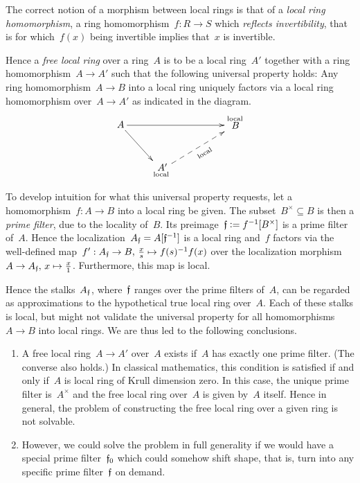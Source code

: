 \documentclass{ws-rv9x6}
\begin{document}
{The correct notion of a morphism between local rings is that of a \emph{local
ring homomorphism}, a ring homomorphism~$f : R \to S$ which \emph{reflects
invertibility}, that is for which~$f(x)$ being invertible implies that~$x$ is
invertible.

Hence a \emph{free local ring} over a ring~$A$ is to be a local ring~$A'$
together with a ring homomorphism~$A \to A'$ such that the following universal
property holds: Any ring homomorphism~$A \to B$ into a local ring uniquely
factors via a local ring homomorphism over~$A \to A'$ as indicated in the diagram.
\[ \xymatrix{
  A \ar[rd] \ar[rrr] &&& {\substack{\text{local}\\\text{\normalsize$\!\!\!B$}\\\phantom{\text{local}}}} \\
  & {\substack{\text{\normalsize$\!\!A'$}\\\text{local}}} \ar@{-->}_[@!31]{\text{local}}[rru]
} \]

To develop intuition for what this universal property requests, let a
homomorphism~$f : A \to B$ into a local ring be given. The subset~$B^\times
\subseteq B$ is then a \emph{prime filter}, due to the locality of~$B$. Its
preimage~$\mathfrak{f} \vcentcolon= f^{-1}[B^\times]$ is a prime filter of~$A$. Hence the
localization~$A_{\mathfrak{f}} = A[\mathfrak{f}^{-1}]$ is a local ring and~$f$ factors via the
well-defined map~$f' : A_{\mathfrak{f}} \to B,\,\frac{x}{s} \mapsto f(s)^{-1}f(x)$ over
the localization morphism~$A \to A_{\mathfrak{f}},\,x \mapsto \frac{x}{1}$. Furthermore,
this map is local.

Hence the stalks~$A_{\mathfrak{f}}$, where~$\mathfrak{f}$ ranges over the prime filters of~$A$,
can be regarded as approximations to the hypothetical true local ring over~$A$.
Each of these stalks is local, but might not validate the universal property
for all homomorphisms~$A \to B$ into local rings. We are thus led to the
following conclusions.

\begin{enumerate}
\item A free local ring~$A \to A'$ over~$A$ exists if~$A$ has exactly one prime
filter. (The converse also holds.) In classical mathematics, this condition is
satisfied if and only if~$A$ is local ring of Krull dimension zero. In this
case, the unique prime filter is~$A^\times$ and the free local ring over~$A$ is given
by~$A$ itself. Hence in general, the problem of constructing the free local
ring over a given ring is not solvable.
\item However, we could solve the problem in full generality if we would have a
special prime filter~$\mathfrak{f}_0$ which could somehow shift shape, that is, turn into any
specific prime filter~$\mathfrak{f}$ on demand.
\end{enumerate}

}
\end{document}
